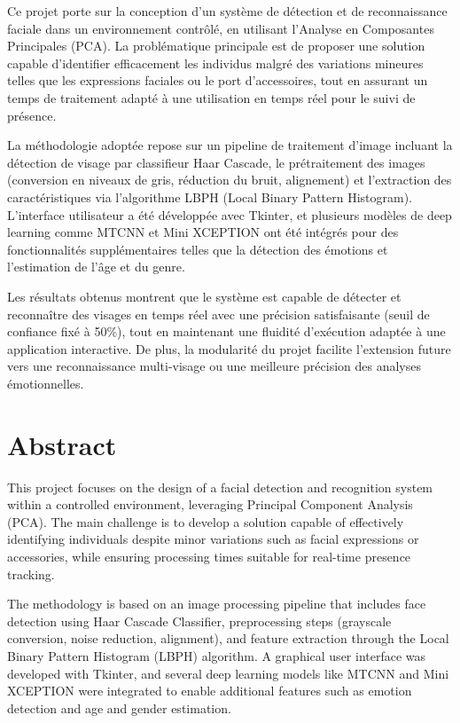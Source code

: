 \documentclass[a4paper,12pt]{report} %
\begin{document}
Ce projet porte sur la conception d'un système de détection et de reconnaissance faciale dans un environnement contrôlé, en utilisant l'Analyse en Composantes Principales (PCA). La problématique principale est de proposer une solution capable d'identifier efficacement les individus malgré des variations mineures telles que les expressions faciales ou le port d'accessoires, tout en assurant un temps de traitement adapté à une utilisation en temps réel pour le suivi de présence. 

La méthodologie adoptée repose sur un pipeline de traitement d'image incluant la détection de visage par classifieur Haar Cascade, le prétraitement des images (conversion en niveaux de gris, réduction du bruit, alignement) et l'extraction des caractéristiques via l'algorithme LBPH (Local Binary Pattern Histogram). L'interface utilisateur a été développée avec Tkinter, et plusieurs modèles de deep learning comme MTCNN et Mini XCEPTION ont été intégrés pour des fonctionnalités supplémentaires telles que la détection des émotions et l'estimation de l'âge et du genre.

Les résultats obtenus montrent que le système est capable de détecter et reconnaître des visages en temps réel avec une précision satisfaisante (seuil de confiance fixé à 50\%), tout en maintenant une fluidité d'exécution adaptée à une application interactive. De plus, la modularité du projet facilite l'extension future vers une reconnaissance multi-visage ou une meilleure précision des analyses émotionnelles.

\vspace{1cm}

\chapter*{Abstract}
\thispagestyle{empty}

\vspace{0.5cm}

This project focuses on the design of a facial detection and recognition system within a controlled environment, leveraging Principal Component Analysis (PCA). The main challenge is to develop a solution capable of effectively identifying individuals despite minor variations such as facial expressions or accessories, while ensuring processing times suitable for real-time presence tracking.

The methodology is based on an image processing pipeline that includes face detection using Haar Cascade Classifier, preprocessing steps (grayscale conversion, noise reduction, alignment), and feature extraction through the Local Binary Pattern Histogram (LBPH) algorithm. A graphical user interface was developed with Tkinter, and several deep learning models like MTCNN and Mini XCEPTION were integrated to enable additional features such as emotion detection and age and gender estimation.
\end{document}
